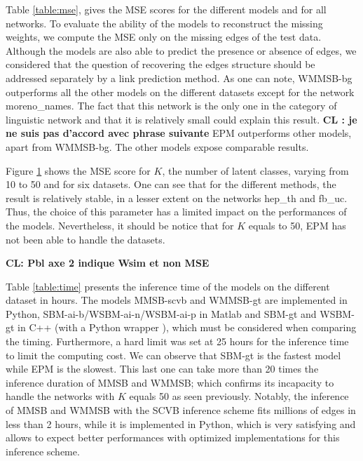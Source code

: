 \begin{table*}[t]
\centering
	
\label{table:mse}
\end{table*}

Table \ref{table:mse}, gives the MSE scores for the different models and for all networks. To evaluate the ability of the models to reconstruct the missing weights, we compute the MSE only on the missing edges of the test data. Although the models are also able to predict the presence or absence of edges,  we considered that the question of recovering the edges structure should be addressed separately by a link prediction method. 
As one can note, WMMSB-bg outperforms all the other models on the different datasets except for the network moreno\_names. 
The fact that this network is the only one in the category of linguistic network and that it is relatively small could explain this result. \textbf{CL : je ne suis pas d'accord avec phrase suivante} EPM outperforms other models, apart from WMMSB-bg. The other models expose comparable results.


\begin{figure}[h]
\centering
	
   \label{fig:k_evolv}
\end{figure}
Figure \ref{fig:k_evolv} shows the MSE score for $K$, the number of latent classes, varying from 10 to 50 and for six datasets. One can see that for the different methods, the result is relatively stable, in a lesser extent on the networks hep\_th and fb\_uc. Thus, the choice of this parameter has a limited impact on the performances of the models. Nevertheless, it should be notice that for $K$ equals  to 50, EPM has not been able to handle the datasets.

\textbf{CL: Pbl axe 2 indique Wsim et non MSE}

\begin{table*}[t]
\centering
	
\label{table:time}
\end{table*}
Table \ref{table:time} presents the inference time of the models on the different dataset in hours. The models MMSB-scvb and WMMSB-gt are implemented in Python, SBM-ai-b/WSBM-ai-n/WSBM-ai-p in Matlab and SBM-gt and WSBM-gt in C++ (with a Python wrapper \cite{peixoto_graph-tool_2014}), which must be considered when comparing the timing. Furthermore, a hard limit  was set at 25 hours for the inference time to limit the computing cost. We can observe that SBM-gt is the fastest model while EPM is the slowest. This last one can take more than 20 times the inference duration of MMSB and WMMSB; which confirms its incapacity to handle the networks with $K$ equals 50 as seen previously. Notably, the inference of MMSB and WMMSB with the SCVB inference scheme fits millions of edges in less than 2 hours, while it is implemented in Python, which is very satisfying and allows to expect better performances  with optimized implementations for this inference scheme.



